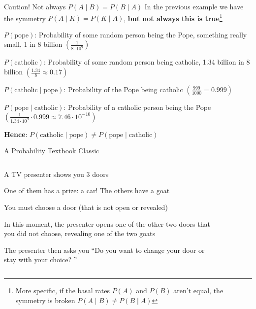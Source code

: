 \begin{frame}{Caution!
		Not always $P(A \mid B) = P(B \mid A)$} In the previous example we have the symmetry $P(A \mid K) = P(K \mid A)$, \textbf{but not always this is true}\footnote{ More specific, if the basal rates $P(A)$ and $P(B)$ aren't equal, the symmetry is broken $P(A \mid B) \neq P(B \mid A)$}
	\begin{example}
		\begin{vfilleditems}
			\small{ \item $P(\text{pope})$: Probability of some random person being the Pope, something really small, 1 in 8 billion $\left( \frac{1}{8 \cdot 10^9} \right)$ \item $P(\text{catholic})$: Probability of some random person being catholic, 1.34 billion in 8 billion $\left( \frac{1.34}{8} \approx 0.17 \right)$ \item $P(\text{catholic} \mid \text{pope})$: Probability of the Pope being catholic $\left( \frac{999}{1000} = 0.999 \right)$ \item $P(\text{pope} \mid \text{catholic})$: Probability of a catholic person being the Pope $\left( \frac{1}{1.34 \cdot 10^9} \cdot 0.999 \approx 7.46 \cdot 10^{-10} \right)$ } \item \large{\textbf{Hence}: $P(\text{catholic} \mid \text{pope}) \neq P(\text{pope} \mid \text{catholic})$}
		\end{vfilleditems}
	\end{example}
\end{frame}

\begin{frame}{A Probability Textbook Classic}
	\begin{columns}
		\begin{column}{0.6\textwidth}
			\begin{example}
				\begin{vfilleditems}
					\small \item A TV presenter shows you 3 doors \item One of them has a prize: a car!
					The others have a goat \item You must choose a door (that is not open or revealed) \item In this moment, the presenter opens one of the other two doors that you did not choose, revealing one of the two goats \item The presenter then asks you ``Do you want to change your door or stay with your choice?
					''
				\end{vfilleditems}
			\end{example}
		\end{column}
		\begin{column}{0.4\textwidth}
			\begin{figure}
				\centering
				\def\svgwidth{\columnwidth}
				
			\end{figure}
		\end{column}
	\end{columns}
\end{frame}

